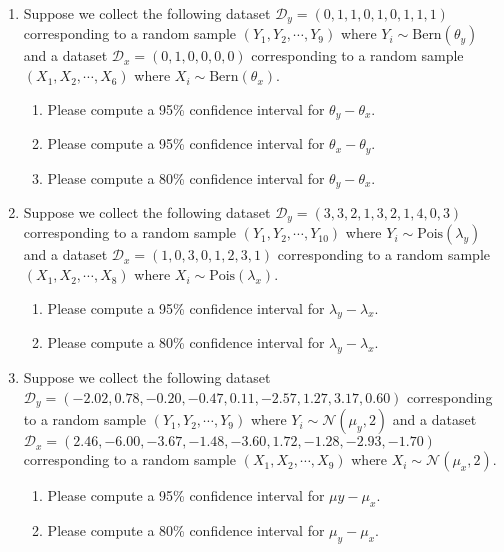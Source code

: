 \begin{enumerate}
    \item Suppose we collect the following dataset $\mathcal{D}_{y} = (0,1,1,0,1,0,1,1,1 )$ corresponding to a random sample $(Y_{1},Y_{2},\cdots,Y_{9})$ where $Y_{i} \sim \text{Bern}(\theta_{y})$ and a dataset $\mathcal{D}_{x} = (0,1,0,0,0,0)$ corresponding to a random sample $(X_{1},X_{2},\cdots,X_{6})$ where $X_{i} \sim \text{Bern}(\theta_{x})$.
    
    \begin{enumerate}
        \item Please compute a 95\% confidence interval for $\theta_{y} - \theta_{x}$.
        \item Please compute a 95\% confidence interval for $\theta_{x} - \theta_{y}$.
        \item Please compute a 80\% confidence interval for $\theta_{y} - \theta_{x}$.
    \end{enumerate}
    
    \item Suppose we collect the following dataset $\mathcal{D}_{y} = (3,3,2,1,3,2,1,4,0,3)$ corresponding to a random sample $(Y_{1},Y_{2},\cdots,Y_{10})$ where $Y_{i} \sim \text{Pois}(\lambda_{y})$ and a dataset $\mathcal{D}_{x} = (1, 0, 3, 0, 1, 2, 3, 1)$ corresponding to a random sample $(X_{1},X_{2},\cdots,X_{8})$ where $X_{i} \sim \text{Pois}(\lambda_{x})$.
    
    \begin{enumerate}
        \item Please compute a 95\% confidence interval for $\lambda_{y} - \lambda_{x}$.
        \item Please compute a 80\% confidence interval for $\lambda_{y} - \lambda_{x}$.
    \end{enumerate}
    
     \item Suppose we collect the following dataset $\mathcal{D}_{y} = (-2.02,  0.78, -0.20, -0.47,  0.11, -2.57,  1.27,  3.17, 0.60)$ corresponding to a random sample $(Y_{1},Y_{2},\cdots,Y_{9})$ where $Y_{i} \sim \mathcal{N}(\mu_{y},2)$ and a dataset $\mathcal{D}_{x} = (2.46, -6.00, -3.67, -1.48, -3.60,  1.72, -1.28, -2.93, -1.70)$ corresponding to a random sample $(X_{1},X_{2},\cdots,X_{9})$ where $X_{i} \sim \mathcal{N}(\mu_{x},2)$.
    
    \begin{enumerate}
        \item Please compute a 95\% confidence interval for $\mu{y} - \mu_{x}$.
        \item Please compute a 80\% confidence interval for $\mu_{y} - \mu_{x}$.
    \end{enumerate}
        
    

\end{enumerate}
